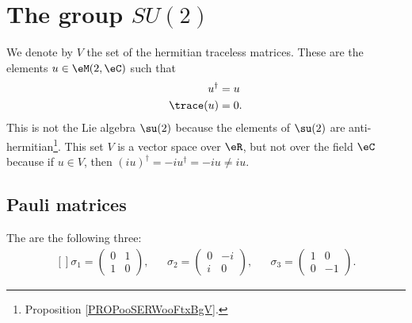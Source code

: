 \section{The group \texorpdfstring{$SU(2)$}{SU2}}

We denote by \( V\) the set of the hermitian traceless matrices. These are the elements \( u\in \eM(2,\eC)\) such that
\begin{subequations}
    \begin{align}
        u^{\dag}&=u\\
        \trace(u)&=0.
    \end{align}
\end{subequations}
This is not the Lie algebra \( \su(2)\) because the elements of \( \su(2)\) are anti-hermitian\footnote{Proposition \ref{PROPooSERWooFtxBgV}.}. This set \( V\) is a vector space over \( \eR\), but not over the field \( \eC\) because if \( u\in V\), then \( (iu)^{\dag}=-iu^{\dag}=-iu\neq iu\).

\subsection{Pauli matrices}

\begin{definition}
    The  are the following three:
    \begin{equation}
        \begin{aligned}[]
            \sigma_1=\begin{pmatrix}
                0    &   1    \\ 
                1    &   0    
            \end{pmatrix},&&
            \sigma_2=\begin{pmatrix}
                0    &   -i    \\ 
                i    &   0    
            \end{pmatrix},&&
            \sigma_3=\begin{pmatrix}
                1    &   0    \\ 
                0    &   -1    
            \end{pmatrix}.
        \end{aligned}
    \end{equation}
\end{definition}

